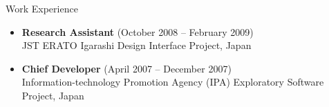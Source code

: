 {\Large\sc Work Experience}
\vspace{-3mm}
\begin{itemize}
\item {\bf Research Assistant} (October 2008 -- February 2009)\\
JST ERATO Igarashi Design Interface Project, Japan
\item {\bf Chief Developer} (April 2007 -- December 2007)\\
Information-technology Promotion Agency (IPA) Exploratory Software Project, Japan
\end{itemize}
